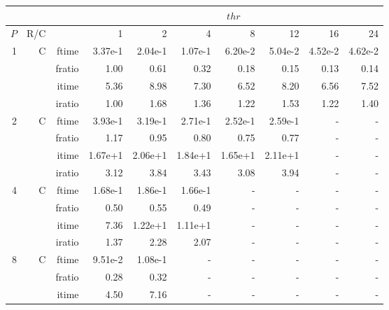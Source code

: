 \documentclass[a4paper]{article}
\begin{document}
\begin{table}[htbp]
\begin{center}
\begin{small}
\begin{tabular}{|r|r|r|r|r|r|r|r|r|r|}
\hline 
     & & & \multicolumn{7}{c|}{$thr$} \\ \hline
    $P$ & R/C &  & 1           & 2    & 4    & 8    & 12   & 16    & 24  \\ \hline\hline
   1 &   C &  ftime &    3.37e-1 &    2.04e-1 &    1.07e-1 &    6.20e-2 &    5.04e-2 &    4.52e-2 &    4.62e-2 \\
             &             &  fratio &    1.00 &   0.61 &   0.32 &    0.18 &    0.15 &    0.13 &    0.14 \\
             &             &  itime &    5.36  &    8.98  &    7.30  &    6.52  &    8.20  &    6.56  &    7.52  \\
             &             &  iratio &    1.00 &    1.68  &    1.36  &    1.22  &    1.53  &    1.22  &    1.40  \\\hline
   2 &  C &  ftime &    3.93e-1 &    3.19e-1 &    2.71e-1 &    2.52e-1 &    2.59e-1 &      - &      - \\
             &             &  fratio &   1.17  &    0.95 &    0.80 &    0.75 &    0.77 &      - &      - \\
             &             &  itime &    1.67e+1 &   2.06e+1 &   1.84e+1 &   1.65e+1 &   2.11e+1 &     - &      - \\
             &             &  iratio &    3.12  &    3.84  &    3.43  &    3.08  &    3.94  &      - &      - \\\hline
   4 &  C &  ftime &    1.68e-1 &    1.86e-1 &    1.66e-1 &      - &      - &      - &      - \\
             &             &  fratio &    0.50 &    0.55 &    0.49 &      - &      - &      - &      - \\
             &             &  itime &    7.36  &    1.22e+1 &   1.11e+1 &     - &      - &      - &      - \\
             &             &  iratio &    1.37  &    2.28  &    2.07  &      - &      - &      - &      - \\\hline
   8 &   C &  ftime &    9.51e-2 &    1.08e-1 &      - &      - &      - &      - &      - \\
             &             &  fratio &    0.28 &    0.32 &      - &      - &      - &      - &      - \\
             &             &  itime &    4.50  &    7.16  &      - &      - &      - &      - &      - \\

\end{tabular}
\end{small}
\end{center}
\end{table}
\end{document}
